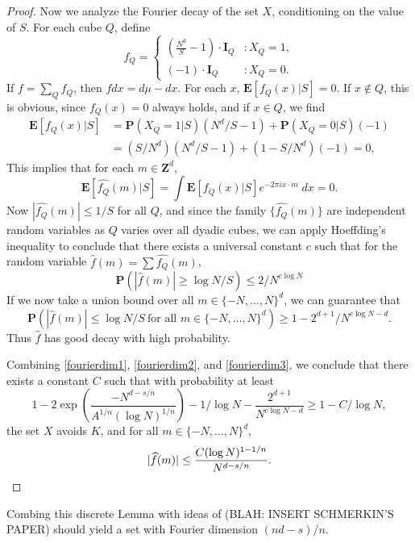 \begin{proof}
    Now we analyze the Fourier decay of the set $X$, conditioning on the value of $S$. For each cube $Q$, define
    \[ f_Q = \begin{cases} \left( \frac{N^d}{S} - 1 \right) \cdot \mathbf{I}_Q & : X_Q = 1, \\ \left( -1 \right) \cdot \mathbf{I}_Q & : X_Q = 0. \end{cases} \]
    If $f = \sum_Q f_Q$, then $f dx = d\mu - dx$. For each $x$, $\mathbf{E}[f_Q(x)|S] = 0$. If $x \not \in Q$, this is obvious, since $f_Q(x) = 0$ always holds, and if $x \in Q$, we find
    \begin{align*}
        \mathbf{E}[f_Q(x)|S] &= \mathbf{P}(X_Q = 1|S) (N^d/S - 1) + \mathbf{P}(X_Q = 0|S) (-1)\\
        &= (S/N^d)(N^d/S - 1) + (1 - S/N^d)(-1) = 0,
    \end{align*}
    This implies that for each $m \in \mathbf{Z}^d$,
    \[ \mathbf{E} \left[ \widehat{f_Q}(m)|S \right] = \int \mathbf{E}[f_Q(x) | S] e^{- 2 \pi i x \cdot m}\; dx = 0. \]
    Now $|\widehat{f_Q}(m)| \leq 1/S$ for all $Q$, and since the family $\big\{ \widehat{f_Q}(m) \big\}$ are independent random variables as $Q$ varies over all dyadic cubes, we can apply Hoeffding's inequality to conclude that there exists a universal constant $c$ such that for the random variable $\widehat{f}(m) = \sum \widehat{f_Q}(m)$,
    \[ \mathbf{P} \left( |\widehat{f}(m)| \geq \log N /S \right) \leq 2/N^{c \log N} \]
    If we now take a union bound over all $m \in \{ -N, \dots, N \}^d$, we can guarantee that
    \begin{equation} \label{fourierdim3}
        \mathbf{P} \left( |\widehat{f}(m)| \leq \log N/S\ \text{for all $m \in \{ -N, \dots, N\}^d$} \right) \geq 1 - 2^{d+1}/N^{c \log N - d}.
    \end{equation}
    Thus $\widehat{f}$ has good decay with high probability.

    Combining \eqref{fourierdim1}, \eqref{fourierdim2}, and \eqref{fourierdim3}, we conclude that there exists a constant $C$ such that with probability at least
    \[ 1 - 2 \exp \left( \frac{-N^{d-s/n}}{A^{1/n} (\log N)^{1/n}} \right) - 1/\log N - \frac{2^{d+1}}{N^{c \log N - d}} \geq 1 - C / \log N, \]
    the set $X$ avoids $K$, and for all $m \in \{ -N, \dots, N \}^d$,
    \[ |\widehat{f}(m)| \leq \frac{C (\log N)^{1-1/n}}{N^{d-s/n}}. \qedhere \]
\end{proof}

Combing this discrete Lemma with ideas of (BLAH: INSERT SCHMERKIN'S PAPER) should yield a set with Fourier dimension $(nd - s)/n$.

